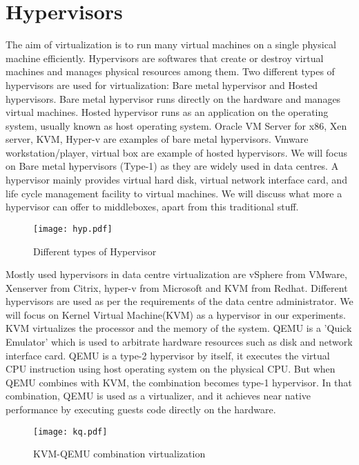 \documentclass[a4paper,11pt]{report}
\begin{document}
\section{Hypervisors}
The aim of virtualization is to run many virtual machines on a single physical machine efficiently. Hypervisors are softwares that create or destroy virtual machines and manages physical resources among them. Two different types of hypervisors are used for virtualization: Bare metal hypervisor and Hosted hypervisors. Bare metal hypervisor runs directly on the hardware and manages virtual machines. Hosted hypervisor runs as an application on the operating system, usually known as host operating system. Oracle VM Server for x86, Xen server, KVM, Hyper-v are examples of bare metal hypervisors. Vmware workstation/player, virtual box are example of hosted hypervisors. We will focus on Bare metal hypervisors (Type-1) as they are widely used in data centres. A hypervisor mainly provides virtual hard disk, virtual network interface card, and life cycle management facility to virtual machines. We will discuss what more a hypervisor can offer to middleboxes, apart from this traditional stuff. 
\begin{figure}[h]
\centering
\texttt{[image: hyp.pdf]}
\caption{Different types of Hypervisor}
\end{figure}  
Mostly used hypervisors in data centre virtualization are vSphere from VMware, Xenserver from Citrix, hyper-v from Microsoft and KVM from Redhat. Different hypervisors are used as per the requirements of the data centre administrator. We will focus on Kernel Virtual Machine(KVM) as a hypervisor in our experiments. KVM virtualizes the processor and the memory of the system. QEMU is a 'Quick Emulator' which is used to arbitrate hardware resources such as disk and network interface card. QEMU is a type-2 hypervisor by itself, it executes the virtual CPU instruction using host operating system on the physical CPU. But when QEMU combines with KVM, the combination becomes type-1 hypervisor. In that combination, QEMU is used as a virtualizer, and it achieves near native performance by executing guests code directly on the hardware. 
\begin{figure}[h]
\centering
\texttt{[image: kq.pdf]}
\caption{KVM-QEMU combination virtualization}
\end{figure} 
\end{document}
